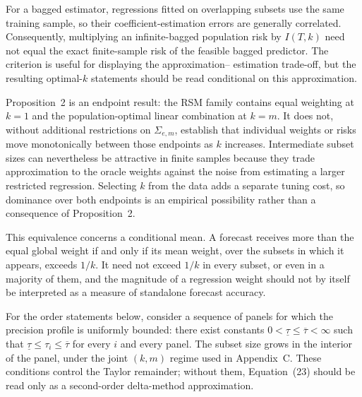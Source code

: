 For a bagged estimator, regressions fitted on overlapping subsets use the same
training sample, so their coefficient-estimation errors are generally
correlated.  Consequently, multiplying an infinite-bagged population risk by
$I(T,k)$ need not equal the exact finite-sample risk of the feasible bagged
predictor.  The criterion is useful for displaying the approximation--
estimation trade-off, but the resulting optimal-$k$ statements should be read
conditional on this approximation.


Proposition~2 is an endpoint result: the RSM family contains equal weighting
at $k=1$ and the population-optimal linear combination at $k=m$.  It does not,
without additional restrictions on $\Sigma_{e,m}$, establish that individual
weights or risks move monotonically between those endpoints as $k$ increases.
Intermediate subset sizes can nevertheless be attractive in finite samples
because they trade approximation to the oracle weights against the noise from
estimating a larger restricted regression.  Selecting $k$ from the data adds a
separate tuning cost, so dominance over both endpoints is an empirical
possibility rather than a consequence of Proposition~2.


This equivalence concerns a conditional mean.  A forecast receives more than
the equal global weight if and only if its mean weight, over the subsets in
which it appears, exceeds $1/k$.  It need not exceed $1/k$ in every subset, or
even in a majority of them, and the magnitude of a regression weight should
not by itself be interpreted as a measure of standalone forecast accuracy.


For the order statements below, consider a sequence of panels for which the
precision profile is uniformly bounded: there exist constants
$0<\underline\tau\le\overline\tau<\infty$ such that
$\underline\tau\le\tau_i\le\overline\tau$ for every $i$ and every panel.
The subset size grows in the interior of the panel, under the joint $(k,m)$
regime used in Appendix~C.  These conditions control the Taylor remainder;
without them, Equation~(23) should be read only as a second-order delta-method
approximation.

